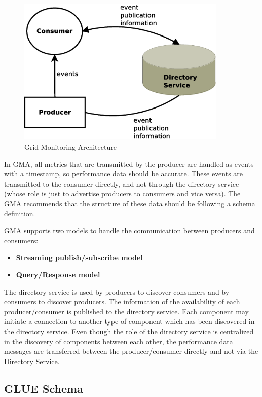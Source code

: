 \begin{figure}[htb]
\centering
 \includegraphics[width=100mm]{images/gma.eps}
\caption{Grid Monitoring Architecture}
\label{figure:gma}
\end{figure}

In \ac{GMA}, all metrics that are transmitted by the producer are handled as events with a timestamp, so performance data should be accurate. These events are transmitted to the consumer directly, and not through the directory service (whose role is just to advertise producers to consumers and vice versa). The GMA recommends that the structure of these data should be following a schema definition. 

\acf{GMA} supports two models to handle the communication between producers and consumers:

\begin{itemize}
\item {\bf Streaming publish/subscribe model}
\item {\bf Query/Response model}
\end{itemize}

The directory service is used by producers to discover consumers and by consumers to discover producers. The information of the availability of each producer/consumer is published to the directory service. Each component may initiate a connection to another type of component which has been discovered in the directory service. Even though the role of the directory service is centralized in the discovery of components between each other, the performance data messages are transferred between the producer/consumer directly and not via the Directory Service.

\subsection{GLUE Schema}

